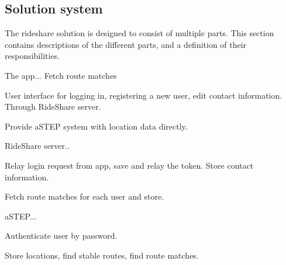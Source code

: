 \subsection{Solution system}
The rideshare solution is designed to consist of multiple parts.
This section contains descriptions of the different parts, and a definition of their responsibilities.


The app...
Fetch route matches

User interface for logging in, registering a new user, edit contact information.
Through RideShare server.

Provide aSTEP system with location data directly.



RideShare server..

Relay login request from app, save and relay the token.
Store contact information. 

Fetch route matches for each user and store.



aSTEP...

Authenticate user by password.

Store locations, find stable routes, find route matches.
